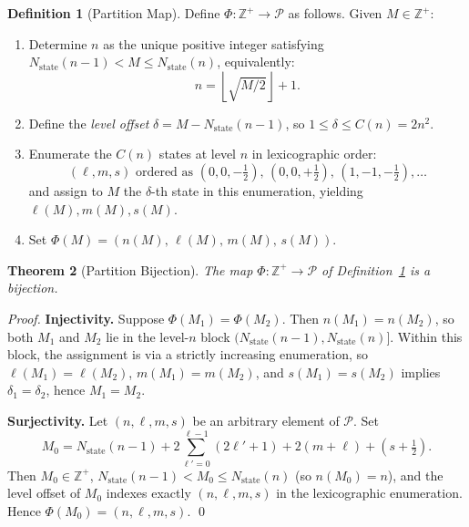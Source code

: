 \documentclass[twocolumn,10pt,a4paper]{article}
\theoremstyle{thmstyle}
\newtheorem{theorem}{Theorem}[section]
\theoremstyle{definition}
\newtheorem{definition}[theorem]{Definition}
\theoremstyle{remark}
\newcommand{\Zp}{\mathbb{Z}^{+}}
\newcommand{\Parts}{\mathcal{P}}
\newcommand{\Nstate}{N_{\mathrm{state}}}
\newcommand{\PhiMap}{\varPhi}
\begin{document}
\begin{definition}[Partition Map]
\label{def:partition-map}
Define $\PhiMap : \Zp \to \Parts$ as follows. Given $M \in \Zp$:
\begin{enumerate}[leftmargin=1.5em,itemsep=0.2em]
\item Determine $n$ as the unique positive integer satisfying $\Nstate(n-1) < M \leq \Nstate(n)$, equivalently:
\begin{equation}
    n = \left\lfloor \sqrt{M/2} \right\rfloor + 1.
    \label{eq:n-inversion}
\end{equation}

\item Define the \emph{level offset} $\delta = M - \Nstate(n-1)$, so $1 \leq \delta \leq C(n) = 2n^2$.

\item Enumerate the $C(n)$ states at level $n$ in lexicographic order:
\begin{equation}
    (\ell, m, s) \text{ ordered as } (0,0,-\tfrac{1}{2}),\,(0,0,+\tfrac{1}{2}),\,(1,-1,-\tfrac{1}{2}),\ldots
\end{equation}
and assign to $M$ the $\delta$-th state in this enumeration, yielding $\ell(M), m(M), s(M)$.

\item Set $\PhiMap(M) = (n(M),\, \ell(M),\, m(M),\, s(M))$.
\end{enumerate}
\end{definition}

\begin{theorem}[Partition Bijection]
\label{thm:bijection}
The map $\PhiMap : \Zp \to \Parts$ of Definition~\ref{def:partition-map} is a bijection.
\end{theorem}

\begin{proof}
\textbf{Injectivity.} Suppose $\PhiMap(M_1) = \PhiMap(M_2)$. Then $n(M_1) = n(M_2)$, so both $M_1$ and $M_2$ lie in the level-$n$ block $(\Nstate(n-1), \Nstate(n)]$. Within this block, the assignment is via a strictly increasing enumeration, so $\ell(M_1) = \ell(M_2)$, $m(M_1) = m(M_2)$, and $s(M_1) = s(M_2)$ implies $\delta_1 = \delta_2$, hence $M_1 = M_2$.

\textbf{Surjectivity.} Let $(n, \ell, m, s)$ be an arbitrary element of $\Parts$. Set
\begin{equation}
    M_0 = \Nstate(n-1) + 2\sum_{\ell'=0}^{\ell-1}(2\ell'+1) + 2(m + \ell) + \left(s + \tfrac{1}{2}\right).
    \label{eq:inverse}
\end{equation}
Then $M_0 \in \Zp$, $\Nstate(n-1) < M_0 \leq \Nstate(n)$ (so $n(M_0) = n$), and the level offset of $M_0$ indexes exactly $(n, \ell, m, s)$ in the lexicographic enumeration. Hence $\PhiMap(M_0) = (n, \ell, m, s)$. \qed
\end{proof}
\end{document}
